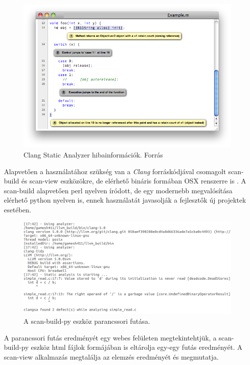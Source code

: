 \documentclass[a4paper,12pt]{report}
\begin{document}
\begin{figure}[h]
\caption{Clang Static Analyzer hibainformációk. Forrás \cite{clangsaimage}}
\centering
\includegraphics[scale=0.6]{analyzer_html.png}
\end{figure}

Alapvetően a használatához szükség van a \emph{Clang} forráskódjával csomagolt scan-build és scan-view eszközökre, de elérhető bináris formában OSX renszerre is \cite{clangsahomepage}. A scan-build alapvetően perl nyelven íródott, de egy modernebb megvalósítása elérhető python nyelven is, ennek használatát javasolják a fejlesztők új projektek esetében.

\begin{figure}[h]
\caption{A scan-build-py eszköz parancssori futása.}
\centering
\includegraphics[scale=0.4]{uninit_commandline.png}
\end{figure}

A parancssori futás eredményét egy webes felületen megtekintehtjük, a scan-build-py eszköz html fájlok formájában is eltárolja egy-egy futás eredményét. A scan-view alkalmazás megtalálja az elemzés eredményét és megmutatja.
\end{document}
